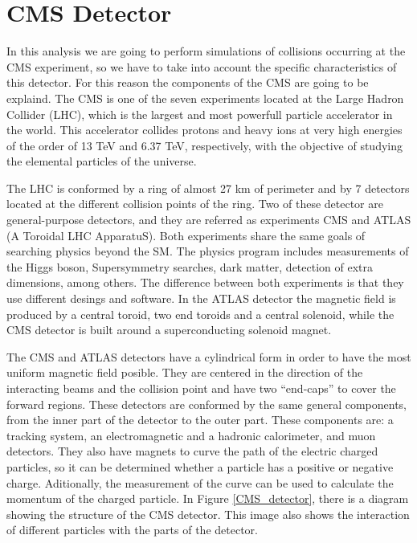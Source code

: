 \chapter{CMS Detector}

In this analysis we are going to perform simulations of collisions occurring at the CMS experiment, so we have to take into account the specific characteristics of this detector. For this reason
the components of the CMS are going to be explaind.
The CMS is one of the seven experiments located at the Large Hadron Collider (LHC), which is the largest and most powerfull particle accelerator in the world. This accelerator collides protons 
and heavy ions at very high energies of the order of 13 TeV and 6.37 TeV, respectively, with the objective of studying the elemental particles of the universe. 


The LHC is conformed by a ring of almost 27 km of perimeter and by 7 detectors located at the different collision points of the ring. Two of these detector are general-purpose detectors, and they 
are referred as experiments CMS and ATLAS (A Toroidal LHC ApparatuS). Both experiments share the same goals of searching physics beyond the SM. The physics program includes measurements of the Higgs boson, 
Supersymmetry searches, dark matter, detection of extra dimensions, among others. The difference between both experiments is that they use different desings and software. In the ATLAS detector the 
magnetic field is produced by a central toroid, two end toroids and a central solenoid, while the CMS detector is built around a superconducting solenoid magnet.  

The CMS and ATLAS detectors have a cylindrical form in order to have the most uniform magnetic field posible. They are centered in the direction of the interacting beams and the collision point and have two ``end-caps'' to cover the forward regions. These detectors are conformed by the same general components, from the inner part of the detector to the outer part. These components are: a tracking system, an electromagnetic and a hadronic calorimeter, and muon detectors. They also have magnets to curve the path of the electric charged particles, so it can be determined whether a particle has a positive or negative charge. Aditionally, the measurement of the curve can be used to calculate the momentum of the charged particle. In Figure \ref{CMS_detector}, there is a diagram showing the structure of the CMS detector. This image also shows the interaction of different particles with the parts of the detector.

